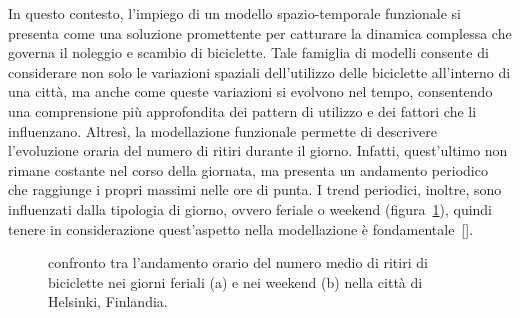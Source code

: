 \par In questo contesto, l'impiego di un modello spazio-temporale funzionale si presenta come una soluzione promettente per catturare la dinamica complessa che governa il noleggio e scambio di biciclette. Tale famiglia di modelli consente di considerare non solo le variazioni spaziali dell'utilizzo delle biciclette all'interno di una città, ma anche come queste variazioni si evolvono nel tempo, consentendo una comprensione più approfondita dei pattern di utilizzo e dei fattori che li influenzano. Altresì, la modellazione funzionale permette di descrivere l'evoluzione oraria del numero di ritiri durante il giorno. Infatti, quest'ultimo non rimane costante nel corso della giornata, ma presenta un andamento periodico che raggiunge i propri massimi nelle ore di punta. I trend periodici, inoltre, sono influenzati dalla tipologia di giorno, ovvero feriale o weekend (figura~\ref{trend_paper_Otto}), quindi tenere in considerazione quest'aspetto nella modellazione è fondamentale~[\cite{paper_bike_sharing_Otto}].

\begin{figure}[htpb]
	\centering
	\quad
	\quad
	\caption[Confronto tra l'andamento orario del numero medio di ritiri nei giorni feriali e nei weekend a Helsinki]{confronto tra l'andamento orario del numero medio di ritiri di biciclette nei giorni feriali (a) e nei weekend (b) nella città di Helsinki, Finlandia.}
	\label{trend_paper_Otto}
\end{figure}


